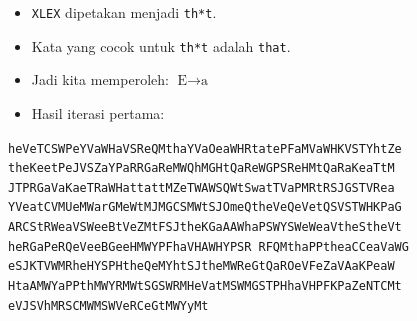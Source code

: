 \documentclass{article}
\begin{document}

\begin{itemize}
    \item \texttt{XLEX} dipetakan menjadi \texttt{th*t}.
    \item Kata yang cocok untuk \texttt{th*t} adalah \texttt{that}.
    \item Jadi kita memperoleh: $\text{E} \rightarrow \text{a}$
    \item Hasil iterasi pertama:
\end{itemize}

\vspace{5mm}

\begin{center}
\texttt{heVeTCSWPeYVaWHaVSReQMthaYVaOeaWHRtatePFaMVaWHKVSTYhtZe\\
theKeetPeJVSZaYPaRRGaReMWQhMGHtQaReWGPSReHMtQaRaKeaTtM\\
JTPRGaVaKaeTRaWHattattMZeTWAWSQWtSwatTVaPMRtRSJGSTVRea\\
YVeatCVMUeMWarGMeWtMJMGCSMWtSJOmeQtheVeQeVetQSVSTWHKPaG\\
ARCStRWeaVSWeeBtVeZMtFSJtheKGaAAWhaPSWYSWeWeaVtheStheVt\\
heRGaPeRQeVeeBGeeHMWYPFhaVHAWHYPSR RFQMthaPPtheaCCeaVaWG\\
eSJKTVWMRheHYSPHtheQeMYhtSJtheMWReGtQaROeVFeZaVAaKPeaW\\
HtaAMWYaPPthMWYRMWtSGSWRMHeVatMSWMGSTPHhaVHPFKPaZeNTCMt\\
eVJSVhMRSCMWMSWVeRCeGtMWYyMt}
\end{center}
\end{document}
